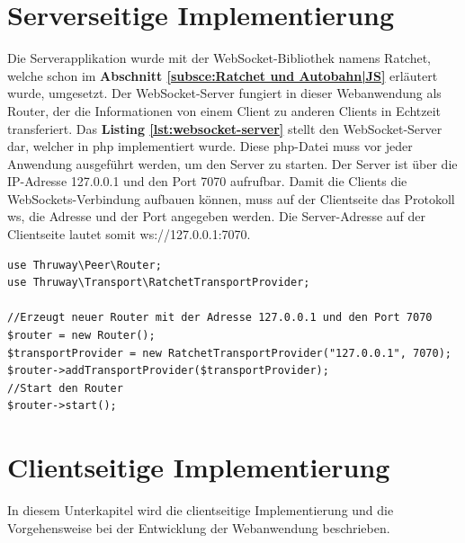 \section{Serverseitige Implementierung}
\label{sec:Serverseitige Implementierung}
Die Serverapplikation wurde mit der WebSocket-Bibliothek namens Ratchet, welche schon im \textbf{Abschnitt \ref{subsce:Ratchet und Autobahn|JS}} erläutert wurde, umgesetzt. Der WebSocket-Server fungiert in dieser Webanwendung als Router, der die Informationen von einem Client zu anderen Clients in Echtzeit transferiert. Das \textbf{Listing \ref{lst:websocket-server}} stellt den WebSocket-Server dar, welcher in php implementiert wurde. Diese php-Datei muss vor jeder Anwendung ausgeführt werden, um den Server zu starten. Der Server ist über die IP-Adresse 127.0.0.1 und den Port 7070 aufrufbar. Damit die Clients die WebSockets-Verbindung aufbauen können, muss auf der Clientseite das Protokoll \glqq ws\grqq{}, die Adresse und der Port angegeben werden. Die Server-Adresse auf der Clientseite lautet somit \glqq ws://127.0.0.1:7070\grqq{}.\bigskip

\begin{lstlisting}[caption={WebSocket-Server - php}, label=lst:websocket-server, captionpos=b]
use Thruway\Peer\Router;
use Thruway\Transport\RatchetTransportProvider;

//Erzeugt neuer Router mit der Adresse 127.0.0.1 und den Port 7070
$router = new Router();
$transportProvider = new RatchetTransportProvider("127.0.0.1", 7070);
$router->addTransportProvider($transportProvider);
//Start den Router
$router->start();
\end{lstlisting}

\newpage
\section{Clientseitige Implementierung}
\label{sec:Clientseitige Implementierung}
In diesem Unterkapitel wird die clientseitige Implementierung und die Vorgehensweise bei der Entwicklung der Webanwendung beschrieben.\bigskip

